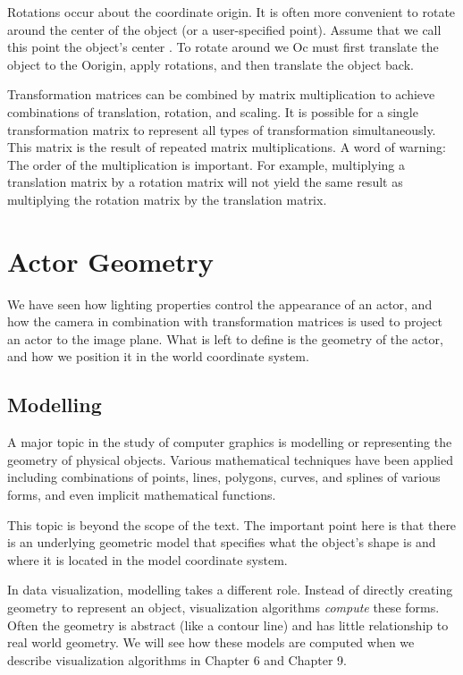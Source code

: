 Rotations occur about the coordinate origin. It is often more convenient to rotate around the center of the object (or a user-specified point). Assume that we call this point the object's center . To rotate around we Oc must first translate the object to the Oorigin, apply rotations, and then translate the object back.

Transformation matrices can be combined by matrix multiplication to achieve combinations of translation, rotation, and scaling. It is possible for a single transformation matrix to represent all types of transformation simultaneously. This matrix is the result of repeated matrix multiplications. A word of warning: The order of the multiplication is important. For example, multiplying a translation matrix by a rotation matrix will not yield the same result as multiplying the rotation matrix by the translation matrix.

\section{Actor Geometry}

We have seen how lighting properties control the appearance of an actor, and how the camera in combination with transformation matrices is used to project an actor to the image plane. What is left to define is the geometry of the actor, and how we position it in the world coordinate system.

\subsection{Modelling}

A major topic in the study of computer graphics is modelling or representing the geometry of physical objects. Various mathematical techniques have been applied including combinations of points, lines, polygons, curves, and splines of various forms, and even implicit mathematical functions.

This topic is beyond the scope of the text. The important point here is that there is an underlying geometric model that specifies what the object's shape is and where it is located in the model coordinate system.

In data visualization, modelling takes a different role. Instead of directly creating geometry to represent an object, visualization algorithms \emph{compute} these forms. Often the geometry is abstract (like a contour line) and has little relationship to real world geometry. We will see how these models are computed when we describe visualization algorithms in Chapter 6 and Chapter 9.

